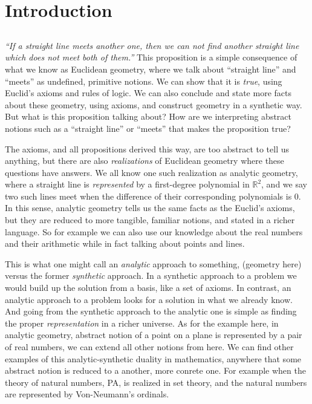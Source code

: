 \section{Introduction}

\subsection*{}
\emph{``If a straight line meets another one, then we can not find another straight line which does not meet both of them.''}
This proposition is a simple consequence of what we know as Euclidean geometry, where we talk about ``straight line'' and ``meets'' as undefined, primitive notions.
We can show that it is \emph{true}, using Euclid's axioms and rules of logic. We can also conclude and state more facts about these geometry, using axioms, and construct geometry in a synthetic way.
But what is this proposition talking about? How are we interpreting abstract notions such as a ``straight line'' or ``meets'' that makes the proposition true?

The axioms, and all propositions derived this way, are too abstract to tell us anything, but there are also \emph{realizations} of Euclidean geometry where these questions have answers.
We all know one such realization as analytic geometry, where a straight line is \emph{represented} by a first-degree polynomial in $\mathbb{R}^2$, and we say two such lines meet when the difference of their corresponding polynomials is $0$.
In this sense, analytic geometry tells us the same facts as the Euclid's axioms, but they are reduced to more tangible, familiar notions, and stated in a richer language. So for example we can also use our knowledge about the real numbers and their arithmetic while in fact talking about points and lines.

This is what one might call an \emph{analytic} approach to something, (geometry here) versus the former \emph{synthetic} approach.
In a synthetic approach to a problem we would build up the solution from a basis, like a set of axioms.
In contrast, an analytic approach to a problem looks for a solution in what we already know.
And going from the synthetic approach to the analytic one is simple as finding the proper \emph{representation} in a richer universe.
As for the example here, in analytic geometry, abstract notion of a point on a plane is represented by a pair of real numbers, we can extend all other notions from here.
We can find other examples of this analytic-synthetic duality in mathematics, anywhere that some abstract notion is reduced to a another, more conrete one.
For example when the theory of natural numbers, PA, is realized in set theory, and the natural numbers are represented by Von-Neumann's ordinals.

